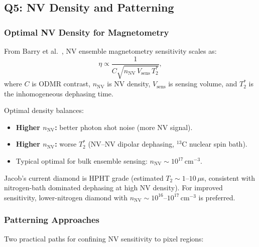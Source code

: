 \subsection{Q5: NV Density and Patterning}
\label{sec:q5}

\subsubsection{Optimal NV Density for Magnetometry}
\label{sec:q5_density}

From Barry et al.~\cite{Barry2020}, NV ensemble magnetometry sensitivity scales as:
\begin{equation}
  \eta \propto \frac{1}{C \sqrt{n_\mathrm{NV}\,V_\mathrm{sens}\,T_2^*}},
  \label{eq:q5_NV_sensitivity}
\end{equation}
where $C$ is ODMR contrast, $n_\mathrm{NV}$ is NV density, $V_\mathrm{sens}$ is
sensing volume, and $T_2^*$ is the inhomogeneous dephasing time.

Optimal density balances:
\begin{itemize}
  \item \textbf{Higher $n_\mathrm{NV}$:} better photon shot noise (more NV signal).
  \item \textbf{Higher $n_\mathrm{NV}$:} worse $T_2^*$ (NV--NV dipolar dephasing,
    $^{13}$C nuclear spin bath).
  \item Typical optimal for bulk ensemble sensing: $n_\mathrm{NV} \sim 10^{17}$\,cm$^{-3}$.
\end{itemize}

Jacob's current diamond is HPHT grade (estimated $T_2 \sim 1$--$10\,\mu$s,
consistent with nitrogen-bath dominated dephasing at high NV density).
For improved sensitivity, lower-nitrogen diamond with
$n_\mathrm{NV} \sim 10^{16}$--$10^{17}$\,cm$^{-3}$ is preferred.

\subsubsection{Patterning Approaches}
\label{sec:q5_patterning}

Two practical paths for confining NV sensitivity to pixel regions:

